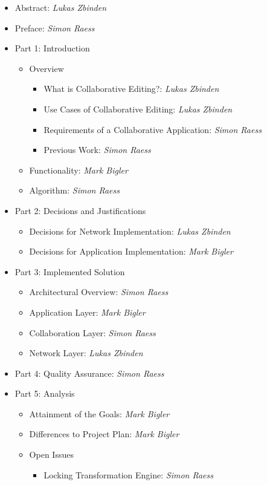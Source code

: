 \begin{itemize}
 \item Abstract: \emph{Lukas Zbinden}
 \item Preface: \emph{Simon Raess}
 \item Part 1: Introduction
 \begin{itemize}
  \item Overview 
  \begin{itemize}
   \item What is Collaborative Editing?: \emph{Lukas Zbinden}
   \item Use Cases of Collaborative Editing: \emph{Lukas Zbinden}
   \item Requirements of a Collaborative Application: \emph{Simon Raess}
   \item Previous Work: \emph{Simon Raess}
  \end{itemize}
  \item Functionality: \emph{Mark Bigler}
  \item Algorithm: \emph{Simon Raess}
 \end{itemize}
 \item Part 2: Decisions and Justifications
 \begin{itemize}
  \item Decisions for Network Implementation: \emph{Lukas Zbinden}
  \item Decisions for Application Implementation: \emph{Mark Bigler}
 \end{itemize}
 \item Part 3: Implemented Solution
 \begin{itemize}
  \item Architectural Overview: \emph{Simon Raess}
  \item Application Layer: \emph{Mark Bigler}
  \item Collaboration Layer: \emph{Simon Raess}
  \item Network Layer: \emph{Lukas Zbinden}
 \end{itemize}
 \item Part 4: Quality Assurance: \emph{Simon Raess}
 \item Part 5: Analysis
 \begin{itemize}
  \item Attainment of the Goals: \emph{Mark Bigler}
  \item Differences to Project Plan: \emph{Mark Bigler}
  \item Open Issues
  \begin{itemize}
   \item Locking Transformation Engine: \emph{Simon Raess}

\end{itemize}
\end{itemize}
\end{itemize}
